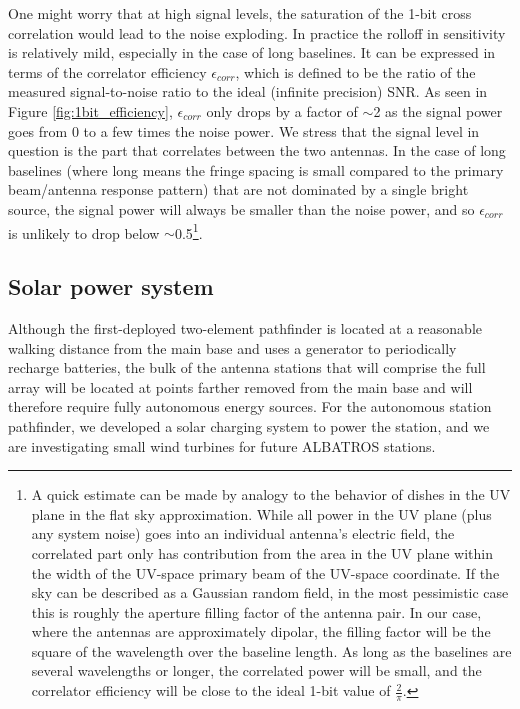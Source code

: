 \documentclass{ws-jai}
\begin{document}
One might worry that at high signal levels, the saturation of the 1-bit cross correlation would lead to the noise exploding.  In practice the rolloff in sensitivity is relatively mild, especially in the case of long baselines.  It can be expressed in terms of the correlator efficiency $\epsilon_{corr}$, which is defined to be the ratio of the measured signal-to-noise ratio to the ideal (infinite precision) SNR.  As seen in Figure \ref{fig:1bit_efficiency}, $\epsilon_{corr}$ only drops by a factor of $\sim$2 as the signal power goes from 0 to a few times the noise power.  We stress that the signal level in question is the part that correlates between the two antennas.  In the case of long baselines (where long means the fringe spacing is small compared to the primary beam/antenna response pattern) that are not dominated by a single bright source, the signal power will always be smaller than the noise power, and so $\epsilon_{corr}$ is unlikely to drop below $\sim$0.5\footnote{A quick estimate can be made by analogy to the behavior of dishes in the UV plane in the flat sky approximation.  While all power in the UV plane (plus any system noise) goes into an individual antenna's electric field, the correlated part only has contribution from the area in the UV plane within the width of the UV-space primary beam of the UV-space coordinate.  If the sky can be described as a Gaussian random field, in the most pessimistic case this is roughly the aperture filling factor of the antenna pair.  In our case, where the antennas are approximately dipolar, the filling factor will be the square of the wavelength over the baseline length.  As long as the baselines are several wavelengths or longer, the correlated power will be small, and the correlator efficiency will be close to the ideal 1-bit value of $\frac{2}{\pi}$.}.


\subsection{Solar power system}

Although the first-deployed two-element pathfinder is located at a
reasonable walking distance from the main base and uses a generator to
periodically recharge batteries, the bulk of the antenna stations that
will comprise the full array will be located at points farther removed
from the main base and will therefore require fully autonomous energy
sources.  For the autonomous station pathfinder, we developed a solar
charging system to power the station, and we are investigating small
wind turbines for future ALBATROS stations.
\end{document}
